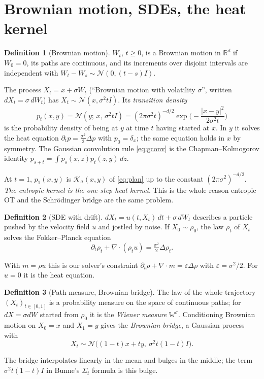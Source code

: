 \documentclass[11pt]{article}
\newcommand{\eps}{\varepsilon}
\newcommand{\R}{\mathbb{R}}
\newcommand{\dv}{\nabla\cdot}
\newcommand{\Nc}{\mathcal{N}}
\newcommand{\Kc}{\mathcal{K}}
\theoremstyle{definition}
\newtheorem{definition}{Definition}[section]
\theoremstyle{plain}
\begin{document}
\section{Brownian motion, SDEs, the heat kernel}
\label{sec:bm}

\begin{definition}[Brownian motion]
$W_t$, $t\ge0$, is a Brownian motion in $\R^d$ if $W_0=0$, its paths are continuous, and
its increments over disjoint intervals are independent with $W_t-W_s\sim\Nc(0,(t-s)I)$.
\end{definition}
The process $X_t=x+\sigma W_t$ (``Brownian motion with volatility $\sigma$'', written
$dX_t=\sigma\,dW_t$) has $X_t\sim\Nc(x,\sigma^2tI)$. Its \emph{transition density}
\begin{equation}
  \label{eq:heat}
  p_t(x,y)=\Nc(y;\,x,\,\sigma^2tI)=(2\pi\sigma^2t)^{-d/2}\exp\!\Big(-\frac{|x-y|^2}{2\sigma^2t}\Big)
\end{equation}
is the probability density of being at $y$ at time $t$ having started at $x$. In $y$ it
solves the heat equation $\partial_tp=\tfrac{\sigma^2}{2}\Delta p$ with $p_0=\delta_x$; the
same equation holds in $x$ by symmetry. The Gaussian convolution rule \eqref{eq:gconv} is
the Chapman--Kolmogorov identity $p_{s+t}=\int p_s(x,z)p_t(z,y)\,dz$.

At $t=1$, $p_1(x,y)$ is $\Kc_\sigma(x,y)$ of \eqref{eq:plan} up to the constant
$(2\pi\sigma^2)^{-d/2}$. \emph{The entropic kernel is the one-step heat kernel.} This is the
whole reason entropic OT and the Schr\"odinger bridge are the same problem.

\begin{definition}[SDE with drift]
$dX_t=u(t,X_t)\,dt+\sigma\,dW_t$ describes a particle pushed by the velocity field $u$ and
jostled by noise. If $X_0\sim\rho_0$, the law $\rho_t$ of $X_t$ solves the Fokker--Planck
equation
\begin{equation}
  \label{eq:fp}
  \partial_t\rho_t+\dv(\rho_tu)=\tfrac{\sigma^2}{2}\Delta\rho_t .
\end{equation}
\end{definition}
With $m=\rho u$ this is our solver's constraint $\partial_t\rho+\dv m=\eps\Delta\rho$ with
$\eps=\sigma^2/2$. For $u=0$ it is the heat equation.

\begin{definition}[Path measure, Brownian bridge]
The law of the whole trajectory $(X_t)_{t\in[0,1]}$ is a probability measure on the space of
continuous paths; for $dX=\sigma dW$ started from $\rho_0$ it is the \emph{Wiener measure}
$\mathbb{W}^{\sigma}$. Conditioning Brownian motion on $X_0=x$ and $X_1=y$ gives the
\emph{Brownian bridge}, a Gaussian process with
\[
  X_t\sim\Nc\big((1-t)x+ty,\ \sigma^2t(1-t)I\big).
\]
\end{definition}
The bridge interpolates linearly in the mean and bulges in the middle; the term
$\sigma^2t(1-t)I$ in Bunne's $\Sigma_t$ formula is this bulge.
\end{document}
